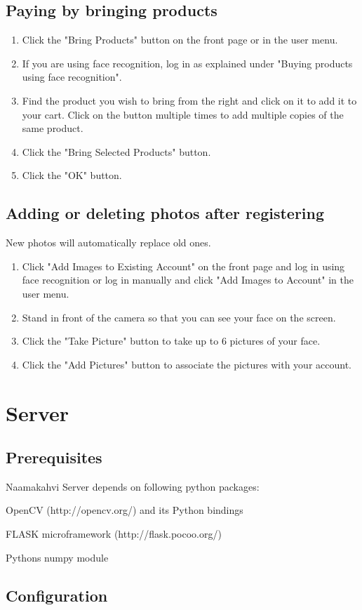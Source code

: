 \documentclass[11pt]{article}
\begin{document}
\subsection{Paying by bringing products}
\begin{enumerate}
\item{Click the "Bring Products" button on the front page or in the user menu.}
\item{If you are using face recognition, log in as explained under "Buying products using
face recognition".}
\item{Find the product you wish to bring from the right and click on it to add it to your cart.
Click on the button multiple times to add multiple copies of the same product.}
\item{Click the "Bring Selected Products" button.}
\item{Click the "OK" button.}
\end{enumerate}
\subsection{Adding or deleting photos after registering}
New photos will automatically replace old ones.
\begin{enumerate}
\item{Click "Add Images to Existing Account" on the front page and log in using face recognition
or log in manually and click "Add Images to Account" in the user menu.}
\item{Stand in front of the camera so that you can see your face on the screen.}
\item{Click the "Take Picture" button to take up to 6 pictures of your face.}
\item{Click the "Add Pictures" button to associate the pictures with your account.}
\end{enumerate}

\section{Server}
\subsection{Prerequisites}
Naamakahvi Server depends on following python packages:
\item{OpenCV (http://opencv.org/) and its Python bindings}
\item{FLASK microframework (http://flask.pocoo.org/)}
\item{Pythons numpy module}
\subsection{Configuration}
\end{document}
